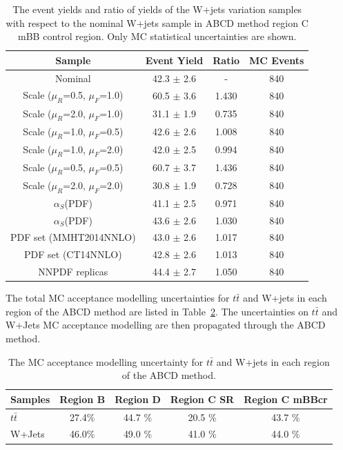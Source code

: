 \begin{table}[htbp!]
\begin{center}
\begin{tabular}{c|c|c||c}
Sample     & Event Yield & Ratio & MC Events \\ 
\hline
Nominal                              & 42.3 $\pm$ 2.6  & -      &  840 \\
Scale ($\mu_{R}$=0.5, $\mu_{F}$=1.0) & 60.5 $\pm$ 3.6  & 1.430  &  840 \\
Scale ($\mu_{R}$=2.0, $\mu_{F}$=1.0) & 31.1 $\pm$ 1.9  & 0.735  &  840 \\
Scale ($\mu_{R}$=1.0, $\mu_{F}$=0.5) & 42.6 $\pm$ 2.6  & 1.008  &  840 \\
Scale ($\mu_{R}$=1.0, $\mu_{F}$=2.0) & 42.0 $\pm$ 2.5  & 0.994  &  840 \\
Scale ($\mu_{R}$=0.5, $\mu_{F}$=0.5) & 60.7 $\pm$ 3.7  & 1.436  &  840 \\
Scale ($\mu_{R}$=2.0, $\mu_{F}$=2.0) & 30.8 $\pm$ 1.9  & 0.728  &  840 \\
$\alpha_{S}$(PDF)                    & 41.1 $\pm$ 2.5  & 0.971  &  840 \\
$\alpha_{S}$(PDF)                    & 43.6 $\pm$ 2.6  & 1.030  &  840 \\
PDF set (MMHT2014NNLO)               & 43.0 $\pm$ 2.6  & 1.017  &  840 \\
PDF set (CT14NNLO)                   & 42.8 $\pm$ 2.6  & 1.013  &  840 \\
NNPDF replicas                       & 44.4 $\pm$ 2.7  & 1.050  &  840 \\
\end{tabular}
\end{center}
\caption{The event yields and ratio of yields of the W+jets variation samples
with respect to the nominal W+jets sample in ABCD method region C mBB control region. 
Only MC statistical uncertainties are shown.} 
\label{tab:boosted_qcd_region_c_mbbcr_systematics_wjets_yields}
\end{table}

The total MC acceptance modelling uncertainties for $t\bar{t}$ and W+jets in each region
of the ABCD method are listed in Table~\ref{tab:boosted_qcd_mcmodel_totaluncertainty}.
The uncertainties on $t\bar{t}$ and W+Jets MC acceptance modelling are then propagated
through the ABCD method.

\begin{table}
\begin{center}
\begin{tabular}{l|c|c|c|c}
\hline
Samples       & Region B & Region D & Region C SR & Region C mBBcr   \\      
\hline
$t\bar{t}$    &  27.4\%   & 44.7 \%  & 20.5 \%  & 43.7 \% \\
W+Jets        &  46.0\%   & 49.0 \%  & 41.0 \%  & 44.0 \% \\         
\end{tabular}
\end{center}
\caption{The MC acceptance modelling uncertainty for $t\bar{t}$ and W+jets in each region of the ABCD method.} 
\label{tab:boosted_qcd_mcmodel_totaluncertainty}
\end{table}

